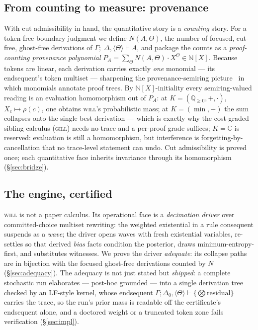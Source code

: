 \documentclass[11pt]{article}
\newcommand{\laxb}[1]{\{#1\}}                   %
\newcommand{\QQ}{\mathbb{Q}}                     %
\newcommand{\NN}{\mathbb{N}}                     %
\newcommand{\CC}{\mathbb{C}}                     %
\newcommand{\gill}{\textsc{gill}}                %
\newcommand{\will}{\textsc{will}}                %
\newcommand{\trz}[1]{\langle #1\rangle}            %
\newcommand{\Tr}{\Theta}                           %
\newcommand{\seq}[3]{#1;\;#2\vdash #3}             %
\theoremstyle{definition}
\theoremstyle{remark}
\begin{document}
\subsection{From counting to measure: provenance}

With cut admissibility in hand, the quantitative story is a
\emph{counting} story.  For a token-free boundary judgment we define
$N(A,\Tr)$, the number of focused, cut-free, ghost-free derivations of
$\seq{\Gamma}{\Delta,\trz{\Tr}}{A}$, and package the counts as a
\emph{proof-counting provenance polynomial}
$P_A = \sum_\Tr N(A,\Tr)\cdot X^{\Tr} \in \NN[X]$.  Because tokens are
linear, each derivation carries exactly \emph{one} monomial --- its
endsequent's token multiset --- sharpening the provenance-semiring
picture~\cite{GreenKT2007,GradelTannen2024} in which monomials annotate
proof trees.  By $\NN[X]$-initiality every semiring-valued reading is
an evaluation homomorphism out of $P_A$: at
$K=(\QQ_{\geq0},+,\cdot)$, $X_c \mapsto \rho(c)$, one obtains \will{}'s
probabilistic mass; at $K = (\min,+)$ the sum collapses onto the
single best derivation --- which is exactly why the
cost-graded sibling calculus (\gill{}) needs no trace and a per-proof
grade suffices; $K=\CC$ is reserved: evaluation is still a
homomorphism, but interference is forgetting-by-cancellation that no
trace-level statement can undo.  Cut admissibility is proved once; each
quantitative face inherits invariance through its homomorphism
(\S\ref{sec:bridge}).

\subsection{The engine, certified}

\will{} is not a paper calculus.  Its operational face is a
\emph{decimation driver} over committed-choice multiset rewriting: the
weighted existential in a rule consequent suspends as a \emph{wave};
the driver opens waves with fresh existential variables, re-settles so
that derived \emph{bias} facts condition the posterior, draws
minimum-entropy-first, and substitutes witnesses.  We prove the driver
\emph{adequate}: its collapse paths are in bijection with the focused
ghost-free derivations counted by $N$ (\S\ref{sec:adequacy}).  The
adequacy is not just stated but \emph{shipped}: a complete stochastic
run elaborates --- post-hoc grounded --- into a single derivation tree
checked by an LF-style kernel, whose endsequent
$\Gamma;\Delta_0,\trz{\Tr}\vdash\laxb{\bigotimes\text{residual}}$
carries the trace, so the run's prior mass is readable off the
certificate's endsequent alone, and a doctored weight or a truncated
token zone fails verification (\S\ref{sec:impl}).
\end{document}
